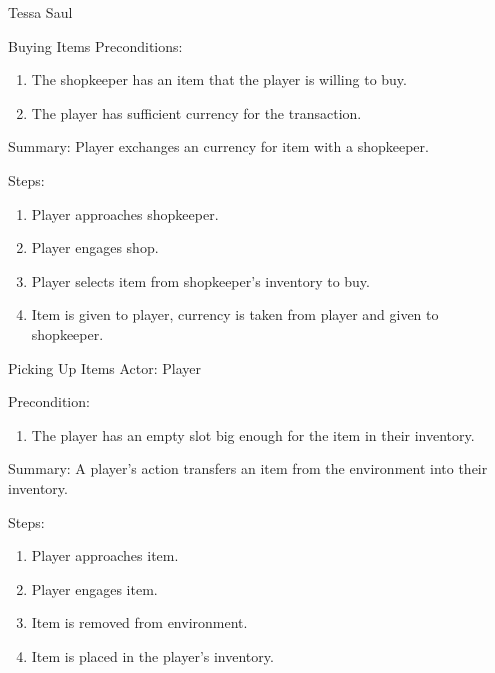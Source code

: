 \documentclass[12pt]{report}
\begin{document}
\begin{section}{Tessa Saul}
\begin{subsection}{Buying Items}
Preconditions:
\begin{enumerate}
\item The shopkeeper has an item that the player is willing to buy.
\item The player has sufficient currency for the transaction.
\end{enumerate}

Summary: Player exchanges an currency for item with a shopkeeper.

Steps: 
\begin{enumerate}
\item Player approaches shopkeeper.
\item Player engages shop.
\item Player selects item from shopkeeper's inventory to buy.
\item Item is given to player, currency is taken from player and given to
shopkeeper.
\end{enumerate}
\end{subsection}

\begin{subsection}{Picking Up Items}
Actor: Player

Precondition:
\begin{enumerate}
\item The player has an empty slot big enough for the item in their
inventory.
\end{enumerate}

Summary: A player's action transfers an item from the environment into their
inventory.

Steps:
\begin{enumerate}
\item Player approaches item.
\item Player engages item.
\item Item is removed from environment.
\item Item is placed in the player's  inventory.
\end{enumerate}
\end{subsection}
\end{section}
\end{document}

